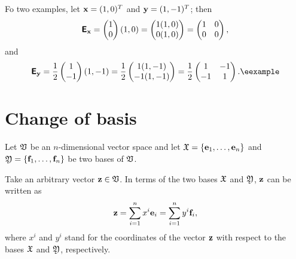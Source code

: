 {
\color{blue}
\bexample
Fo two examples, let
${\bf x}=(1,0)^T$
and
${\bf y}=(1,-1)^T$;
then
$$
\textsf{\textbf{E}}_{\bf x}
=
\begin{pmatrix}
1\\
0
\end{pmatrix}
(1,0)
=
\begin{pmatrix}
1(1,0)\\
0(1,0)
\end{pmatrix}
=
\begin{pmatrix}
1&0\\
0&0
\end{pmatrix}
,
$$
and
$$
\textsf{\textbf{E}}_{\bf y}
= \frac{1}{2}
\begin{pmatrix}
1\\
-1
\end{pmatrix}
(1,-1)
= \frac{1}{2}
\begin{pmatrix}
1(1,-1)\\
-1(1,-1)
\end{pmatrix}
= \frac{1}{2}
\begin{pmatrix}
1&-1\\
-1&1
\end{pmatrix}
.
\textrm{\eexample}
$$
}



\section{Change of basis}
\label{2012-m-ch-fdlvs-changeofbasis}

Let ${\frak V}$ be an $n$-dimensional vector space and let
${\frak X}
=
\{
{\bf e}_1,
\ldots ,
{\bf e}_n
\}$
and
${\frak Y}
=  \{
{\bf f}_1,
\ldots ,
{\bf f}_n
\}$ be two bases of ${\frak V}$.

Take an arbitrary vector ${\bf z}\in {\frak V}$.
In terms of the two bases
${\frak X}$ and
${\frak Y}$,
${\bf z}$ can be written as
\begin{equation}
{\bf z}=
\sum_{i=1}^n x^i{\bf e}_i
=
\sum_{i=1}^n  y^i{\bf f}_i,
\label{2011-m-btbexy}
\end{equation}
where $x^i$ and $y^i$ stand for the coordinates of the vector  ${\bf z}$
with respect to the bases ${\frak X}$ and
${\frak Y}$,
respectively.

